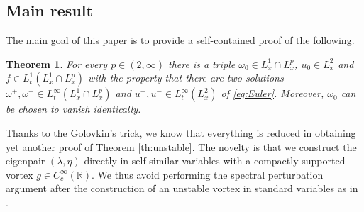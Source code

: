 \documentclass[11pt,reqno]{amsproc}
\def\RR {\mathbb{R}}
\newtheorem{theorem}[proposition]{Theorem}
\theoremstyle{definition}
\theoremstyle{definition}
\numberwithin{equation}{section}
\begin{document}
\subsection{Main result}
The main goal of this paper is to provide a self-contained proof of the following.
\begin{theorem}
\label{th:vishik2}
For every $p\in(2,\infty)$ there is a triple $\omega_0\in L^1_x\cap L^p_x$, $u_0\in L^2_x$ and $f\in L^1_t(L^1_x\cap L^p_x)$ with the property that there are two solutions $\omega^+,\omega^{-}\in L^\infty_t(L^1_x\cap L^p_x)$ and $u^+,u^-\in L^\infty_t(L^2_x)$ of \cref{eq:Euler}. Moreover, $\omega_0$ can be chosen to vanish identically.
\end{theorem}
 Thanks to the Golovkin's trick, we know that everything is reduced in obtaining yet another proof of Theorem \ref{th:unstable}.  The novelty is that we construct the eigenpair $(\lambda,\eta)$ directly in self-similar variables with a compactly supported vortex $g\in C^\infty_c(\RR)$. We thus avoid performing the spectral perturbation argument after the construction of an unstable vortex in standard variables as in \cite{vishik2018instability1,vishik2018instability2,vishik_notes,castro2024proof}. 
\end{document}
